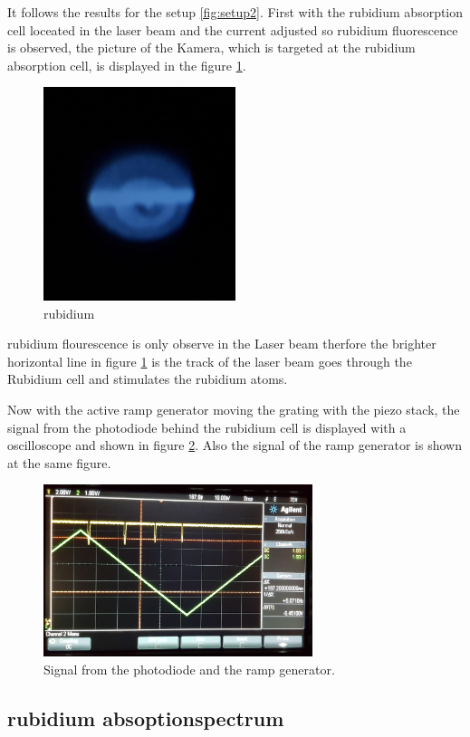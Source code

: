 It follows the results for the setup \ref{fig:setup2}.
First with the rubidium absorption cell loceated in the laser beam
and the current adjusted so rubidium fluorescence is observed, the picture of the
Kamera, which is targeted at the
rubidium absorption cell, is
displayed in the figure \ref{fig:Floures}.

\begin{figure}
  \centering
  \includegraphics[width = 0.5\textwidth]{figures/Rb_leuchten.jpg}
  \caption{rubidium }
  \label{fig:Floures}
\end{figure}

rubidium flourescence is only observe in the Laser beam therfore
the brighter horizontal line
in figure \ref{fig:Floures}
is the track of the laser beam
goes through the Rubidium cell and stimulates the rubidium atoms.

Now with the active ramp generator moving the grating with the piezo stack,
the signal from the photodiode behind the rubidium cell
is displayed with a
oscilloscope and shown in figure \ref{fig:ramp}.
Also the signal of the ramp generator is shown at the same
figure.

\begin{figure}
  \centering
  \includegraphics[width = 0.7\textwidth]{figures/Ramp.jpg}
  \caption{Signal from the photodiode and the ramp generator.}
  \label{fig:ramp}
\end{figure}




\subsection{rubidium absoptionspectrum}
\label{sec:ru_absoption}

